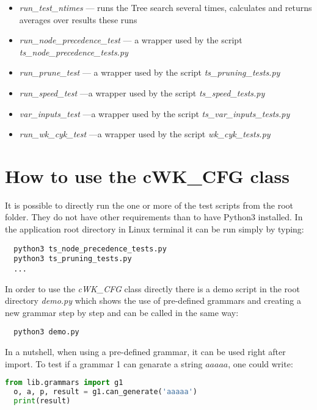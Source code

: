 \begin{itemize}
  \item{\textit{run\_test\_ntimes} --- runs the Tree search several times, calculates and returns averages over results these runs}
  \item{\textit{run\_node\_precedence\_test} --- a wrapper used by the script \textit{ts\_node\_precedence\_tests.py}}
  \item{\textit{run\_prune\_test} --- a wrapper used by the script \textit{ts\_pruning\_tests.py}}
  \item{\textit{run\_speed\_test} ---a wrapper used by the script \textit{ts\_speed\_tests.py}}
  \item{\textit{var\_inputs\_test} ---a wrapper used by the script \textit{ts\_var\_inputs\_tests.py}}
  \item{\textit{run\_wk\_cyk\_test} ---a wrapper used by the script \textit{wk\_cyk\_tests.py}}
\end{itemize}


\section{How to use the cWK\_CFG class}
It is possible to directly run the one or more of the test scripts from the root folder. They do not have other requirements than to have Python3 installed. In the application root directory in Linux terminal it can be run simply by typing:

\begin{verbatim}
  python3 ts_node_precedence_tests.py
  python3 ts_pruning_tests.py
  ...
\end{verbatim}

In order to use the \textit{cWK\_CFG} class directly there is a demo script in the root directory \textit{demo.py} which shows the use of pre-defined grammars and creating a new grammar step by step and can be called in the same way:

\begin{verbatim}
  python3 demo.py
\end{verbatim}

In a nutshell, when using a pre-defined grammar, it can be used right after import. To test if a grammar 1 can genarate a string $aaaaa$, one could write:
\begin{lstlisting}[language=Python]
  from lib.grammars import g1
  o, a, p, result = g1.can_generate('aaaaa')
  print(result)
\end{lstlisting}

